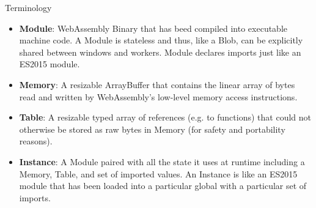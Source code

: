 \documentclass{beamer}
\begin{document}
\begin{frame}{Terminology}
\begin{itemize} 
    \item \textbf{Module}: WebAssembly Binary that has beed compiled into executable machine code. A Module is stateless and thus, like a Blob, can be explicitly shared between windows and workers. Module declares imports just like an ES2015 module.
    \item \textbf{Memory}: A resizable ArrayBuffer that contains the linear array of bytes read and written by WebAssembly’s low-level memory access instructions.
    \item \textbf{Table}: A resizable typed array of references (e.g. to functions) that could not otherwise be stored as raw bytes in Memory (for safety and portability reasons).
    \item \textbf{Instance}: A Module paired with all the state it uses at runtime including a Memory, Table, and set of imported values. An Instance is like an ES2015 module that has been loaded into a particular global with a particular set of imports.
\end{itemize}
\end{frame}
\end{document}

